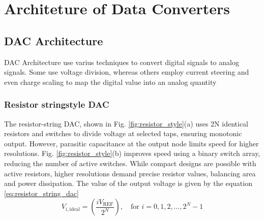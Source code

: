 \chapter{Architeture of Data Converters}
\addborderb
\label{chapter:architecture}
\section{DAC Architecture}
\label{sec:dac_architecture}
DAC Architecture use varius techniques to convert digital signals to analog signals.
Some use voltage division, whereas others employ current
steering and even charge scaling to map the digital value into an analog quantity

\subsection{Resistor stringstyle DAC}
The resistor-string DAC, shown in Fig. \ref{fig:resistor_style}(a) uses 2N identical resistors and switches to divide voltage at selected taps, ensuring monotonic output. However, parasitic capacitance at the output node limits speed for higher resolutions. Fig. \ref{fig:resistor_style}(b) improves speed using a binary switch array, reducing the number of active switches. While compact designs are possible with active resistors, higher resolutions demand precise resistor values, balancing area and power dissipation.
The value of the output voltage is given by the equation \ref{eq:resistor_string_dac}
\begin{equation}
\label{eq:resistor_string_dac}
	V_{i,\text{ideal}} = \left( \frac{i V_{\text{REF}}}{2^N} \right), \quad \text{for } i = 0, 1, 2, \ldots, 2^N - 1
\end{equation}

